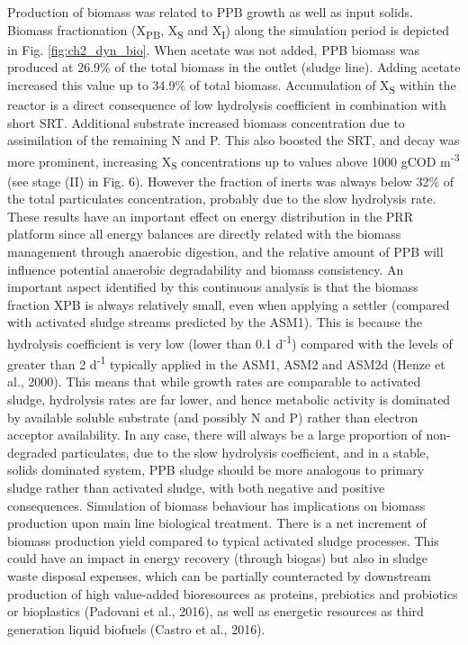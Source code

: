 \skippingparagraph
Production of biomass was related to PPB growth as well as input solids. Biomass fractionation (X\textsubscript{PB}, X\textsubscript{S} and X\textsubscript{I}) along the simulation period is depicted in Fig. \ref{fig:ch2_dyn_bio}. When acetate was not added, PPB biomass was produced at 26.9\% of the total biomass in the outlet (sludge line). Adding acetate increased this value up to 34.9\% of total biomass. Accumulation of X\textsubscript{S} within the reactor is a direct consequence of low hydrolysis coefficient in combination with short SRT. Additional substrate increased biomass concentration due to assimilation of the remaining N and P. This also boosted the SRT, and decay was more prominent, increasing X\textsubscript{S} concentrations up to values above 1000 gCOD m\textsuperscript{-3} (see stage (II) in Fig. 6). However the fraction of inerts was always below 32\% of the total particulates concentration, probably due to the slow hydrolysis rate. These results have an important effect on energy distribution in the PRR platform since all energy balances are directly related with the biomass management through anaerobic digestion, and the relative amount of PPB will influence potential anaerobic degradability and biomass consistency. An important aspect identified by this continuous analysis is that the biomass fraction XPB is always relatively small, even when applying a settler (compared with activated sludge streams predicted by the ASM1). This is because the hydrolysis coefficient is very low (lower than 0.1 d\textsuperscript{-1}) compared with the levels of greater than 2 d\textsuperscript{-1} typically applied in the ASM1, ASM2 and ASM2d \cite{henze1987} (Henze et al., 2000). This means that while growth rates are comparable to activated sludge, hydrolysis rates are far lower, and hence metabolic activity is dominated by available soluble substrate (and possibly N and P) rather than electron acceptor availability. In any case, there will always be a large proportion of non-degraded particulates, due to the slow hydrolysis coefficient, and in a stable, solids dominated system, PPB sludge should be more analogous to primary sludge rather than activated sludge, with both negative and positive consequences.
\skippingparagraph
Simulation of biomass behaviour has implications on biomass production upon main line biological treatment. There is a net increment of biomass production yield compared to typical activated sludge processes. This could have an impact in energy recovery (through biogas) but also in sludge waste disposal expenses, which can be partially counteracted by downstream production of high value-added bioresources as proteins, prebiotics and probiotics \cite{matassa2015} or bioplastics (Padovani et al., 2016), as well as energetic resources as third generation liquid biofuels \cite{castro2017}(Castro et al., 2016).


